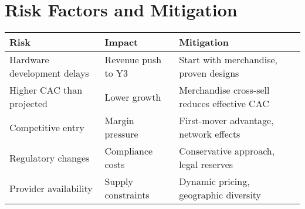\documentclass[11pt]{article}
\begin{document}
\section{Risk Factors and Mitigation}

\begin{table}[H]
\centering
\begin{tabularx}{\linewidth}{l X X}
\toprule
Risk & Impact & Mitigation \\\midrule
Hardware development delays & Revenue push to Y3 & Start with merchandise, proven designs \\
Higher CAC than projected & Lower growth & Merchandise cross-sell reduces effective CAC \\
Competitive entry & Margin pressure & First-mover advantage, network effects \\
Regulatory changes & Compliance costs & Conservative approach, legal reserves \\
Provider availability & Supply constraints & Dynamic pricing, geographic diversity \\
\bottomrule
\end{tabularx}
\end{table}

\printbibliography
\end{document}
